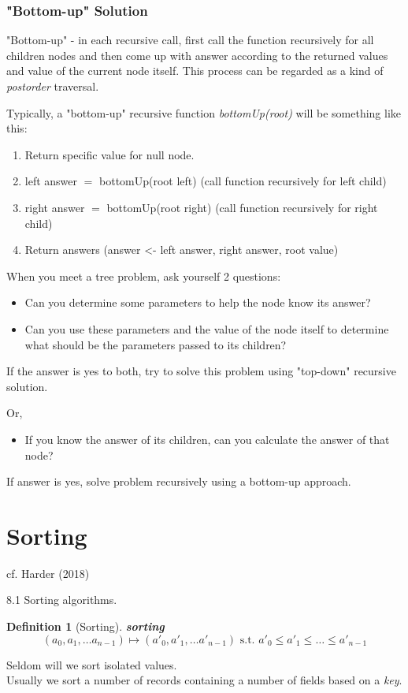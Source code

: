 \documentclass[10pt]{amsart}
\newtheorem{definition}{Definition}
\begin{document}
\begin{multicols*}{2}
\subsubsection{"Bottom-up" Solution}

"Bottom-up" - in each recursive call, first call the function recursively for all children nodes and then come up with answer according to the returned values and value of the current node itself. This process can be regarded as a kind of \emph{postorder} traversal.

Typically, a "bottom-up" recursive function \emph{bottomUp(root)} will be something like this:

\begin{enumerate}
	\item Return specific value for null node.
	\item left answer $=$ bottomUp(root left) (call function recursively for left child)
	\item right answer $=$ bottomUp(root right) (call function recursively for right child)
	\item Return answers (answer <- left answer, right answer, root value)
\end{enumerate}

When you meet a tree problem, ask yourself 2 questions: 
\begin{itemize}
	\item Can you determine some parameters to help the node know its answer?
	\item Can you use these parameters and the value of the node itself to determine what should be the parameters passed to its children?
\end{itemize}
If the answer is yes to both, try to solve this problem using "top-down" recursive solution.

Or,
\begin{itemize}
	\item If you know the answer of its children, can you calculate the answer of that node?
\end{itemize}
If answer is yes, solve problem recursively using a bottom-up approach.


\section{Sorting}

cf. Harder (2018) \cite{Hard2018}

8.1 Sorting algorithms. 

\begin{definition}[Sorting]
	\textbf{sorting}
	\begin{equation}
	(a_0, a_1, \dots a_{n-1}) \mapsto (a'_0, a'_1, \dots a'_{n-1}) \text{ s.t. } a'_0 \leq a'_1 \leq \dots \leq a'_{n-1}
	\end{equation}
\end{definition}
Seldom will we sort isolated values. \\
Usually we sort a number of records containing a number of fields based on a \emph{key}. \\



\end{multicols*}
\end{document}
